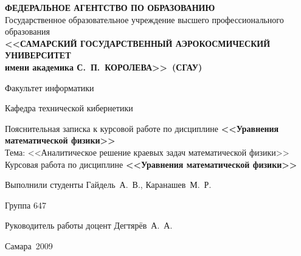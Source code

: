 \begin{titlepage}
\newpage

\begin{center}
\scriptsize
\textbf{ФЕДЕРАЛЬНОЕ АГЕНТСТВО ПО ОБРАЗОВАНИЮ}\\
Государственное образовательное учреждение высшего профессионального образования\\
\textbf{<<САМАРСКИЙ ГОСУДАРСТВЕННЫЙ АЭРОКОСМИЧЕСКИЙ УНИВЕРСИТЕТ}\\
\textbf{имени академика С.~П.~КОРОЛЕВА>>~(СГАУ)}
\normalsize

\vfill

Факультет информатики

Кафедра технической кибернетики

\vfill
\Large
Пояснительная записка к курсовой работе по дисциплине \textbf{<<Уравнения математической физики>>}\\
\normalsize
Тема: <<Аналитическое решение краевых задач математической физики>>
Курсовая работа по дисциплине \textbf{<<Уравнения математической физики>>}
\end{center}

\vfill

Выполнили студенты Гайдель~А.~В., Каранашев~М.~Р.

Группа 647

Руководитель работы доцент Дегтярёв~А.~А.


\vfill

\begin{center}
Самара~2009
\end{center}
\end{titlepage}